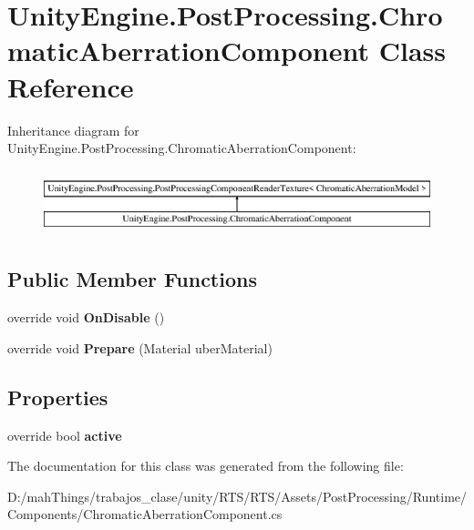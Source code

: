 \hypertarget{class_unity_engine_1_1_post_processing_1_1_chromatic_aberration_component}{}\section{Unity\+Engine.\+Post\+Processing.\+Chromatic\+Aberration\+Component Class Reference}
\label{class_unity_engine_1_1_post_processing_1_1_chromatic_aberration_component}
Inheritance diagram for Unity\+Engine.\+Post\+Processing.\+Chromatic\+Aberration\+Component\+:\begin{figure}[H]
\begin{center}
\leavevmode
\includegraphics[height=1.895093cm]{class_unity_engine_1_1_post_processing_1_1_chromatic_aberration_component}
\end{center}
\end{figure}
\subsection*{Public Member Functions}
\begin{DoxyCompactItemize}
\item 
\mbox{\label{class_unity_engine_1_1_post_processing_1_1_chromatic_aberration_component_aa88d860317b08f10454a6021dce03069}} 
override void {\bfseries On\+Disable} ()
\item 
\mbox{\label{class_unity_engine_1_1_post_processing_1_1_chromatic_aberration_component_acbf442cadd4fcb16e9008ecfd32698fa}} 
override void {\bfseries Prepare} (Material uber\+Material)
\end{DoxyCompactItemize}
\subsection*{Properties}
\begin{DoxyCompactItemize}
\item 
\mbox{\label{class_unity_engine_1_1_post_processing_1_1_chromatic_aberration_component_ab1fb32c83cea3eb44e199fe7b6fb05e5}} 
override bool {\bfseries active}
\end{DoxyCompactItemize}


The documentation for this class was generated from the following file\+:\begin{DoxyCompactItemize}
\item 
D\+:/mah\+Things/trabajos\+\_\+clase/unity/\+R\+T\+S/\+R\+T\+S/\+Assets/\+Post\+Processing/\+Runtime/\+Components/Chromatic\+Aberration\+Component.\+cs\end{DoxyCompactItemize}
